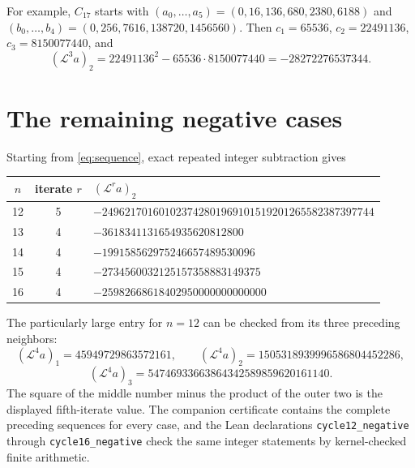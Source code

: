 \documentclass[11pt]{article}
\begin{document}
For example, $C_{17}$ starts with
$(a_0,\ldots,a_5)=(0,16,136,680,2380,6188)$ and
$(b_0,\ldots,b_4)=(0,256,7616,138720,1456560)$.
Then $c_1=65536$, $c_2=22491136$, $c_3=8150077440$, and
\[
 (\mathcal L^3a)_2=22491136^2-65536\cdot8150077440
                 =-28272276537344.
\]

\section{The remaining negative cases}
Starting from \eqref{eq:sequence}, exact repeated integer subtraction gives
\begin{center}
\begin{tabular}{ccl}
\toprule
$n$ & iterate $r$ & $(\mathcal L^r a)_2$\\\midrule
12 & 5 & $-249621701601023742801969101519201265582387397744$\\
13 & 4 & $-3618341131654935620812800$\\
14 & 4 & $-199158562975246657489530096$\\
15 & 4 & $-2734560032125157358883149375$\\
16 & 4 & $-25982668618402950000000000000$\\\bottomrule
\end{tabular}
\end{center}
The particularly large entry for $n=12$ can be checked from its three
preceding neighbors:
\[
 (\mathcal L^4 a)_1=45949729863572161,\qquad
 (\mathcal L^4 a)_2=1505318939996586804452286,
\]
\[
 (\mathcal L^4 a)_3=54746933663864342589859620161140.
\]
The square of the middle number minus the product of the outer two is
the displayed fifth-iterate value. The companion certificate contains the
complete preceding sequences for every case, and the Lean declarations
\texttt{cycle12\_negative} through \texttt{cycle16\_negative} check the same
integer statements by kernel-checked finite arithmetic.
\end{document}
